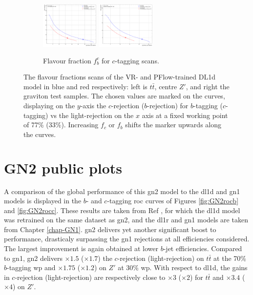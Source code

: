 \begin{figure}[h!]
\begin{subfigure}[b]{\textwidth}
    \includegraphics[width=0.32\textwidth]{Images/FTAG/VRDL1d/scansfraction/thesis_plot_frac_c/contour_fraction_zpext_2000.pdf}
    \includegraphics[width=0.32\textwidth]{Images/FTAG/VRDL1d/scansfraction/thesis_plot_frac_c/contour_fraction_graviton_2000.pdf}
    \caption{Flavour fraction $f_b^c$ for $c$-tagging scans.} 
    \label{fig:DL1dVRscanfc}
\end{subfigure}
  \caption{The flavour fractions scans of the VR- and PFlow-trained DL1d model in blue and red respectively: left is $t\bar{t}$, centre $Z'$, and right the graviton test samples. The chosen values are marked on the curves, displaying on the $y$-axis the $c$-rejection ($b$-rejection) for $b$-tagging ($c$-tagging) vs the light-rejection on the $x$ axis at a fixed working point of 77\% (33\%). Increasing $f_c$ or $f_b$ shifts the marker upwards along the curves. }
  \label{apfig:DL1dVRscanf}
\end{figure} 

\section{GN2 public plots}
A comparison of the global performance of this \gls{gn2} model to the \gls{dl1d} and \gls{gn1} models is displayed in the $b$- and $c$-tagging \gls{roc} curves of Figures \ref{fig:GN2rocb} and \ref{fig:GN2rocc}. These results are taken from Ref \cite{ATL-PLOT-FTAG-2023-01}, for which the \gls{dl1d} model was retrained on the same dataset as \gls{gn2}, and the \gls{dl1r} and \gls{gn1} models are taken from Chapter \ref{chap-GN1}. \gls{gn2} delivers yet another significant boost to performance, drasticaly surpassing the \gls{gn1} rejections at all efficiencies considered. The largest improvement is again obtained at lower $b$-jet efficiencies. Compared to \gls{gn1}, \gls{gn2} delivers $\times 1.5$ ($\times 1.7$) the $c$-rejection (light-rejection) on $t\bar{t}$ at the 70\% $b$-tagging \gls{wp} and $\times 1.75$ ($\times 1.2$) on $Z'$ at 30\% \gls{wp}. With respect to \gls{dl1d}, the gains in $c$-rejection (light-rejection) are respectively close to $\times 3$ ($\times 2$) for $t\bar{t}$ and $\times 3.4$ ($\times 4$) on $Z'$. 

